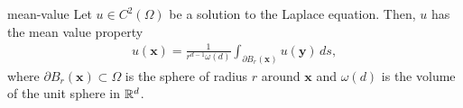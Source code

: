\begin{Theorem}{mean-value}
  Let $u\in C^2(\Omega)$ be a solution to the Laplace equation. Then,
  $u$ has the mean value property
  \begin{gather}
    \label{eq:mean-value:1}
    u(\mathbf x) = \frac1{r^{d-1}\omega(d)}
    \int_{\partial B_r(\mathbf x)} u(\mathbf y) \,ds,
  \end{gather}
  where $\partial B_r(\mathbf x) \subset \Omega$ is the sphere of
  radius $r$ around $\mathbf x$ and $\omega(d)$ is the volume of the
  unit sphere in $\mathbb R^d$.
\end{Theorem}
